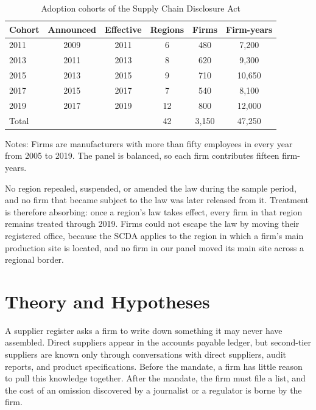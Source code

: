 \documentclass[11pt]{article}
\begin{document}
\begin{table}[ht]
\centering
\begin{threeparttable}
\caption{Adoption cohorts of the Supply Chain Disclosure Act}
\label{tab:cohorts}
\small
\begin{tabular}{lccccc}
\toprule
Cohort & Announced & Effective & Regions & Firms & Firm-years \\
\midrule
2011 & 2009 & 2011 & 6 & 480 & 7,200 \\
2013 & 2011 & 2013 & 8 & 620 & 9,300 \\
2015 & 2013 & 2015 & 9 & 710 & 10,650 \\
2017 & 2015 & 2017 & 7 & 540 & 8,100 \\
2019 & 2017 & 2019 & 12 & 800 & 12,000 \\
\midrule
Total & & & 42 & 3,150 & 47,250 \\
\bottomrule
\end{tabular}
\begin{tablenotes}\footnotesize
\item Notes: Firms are manufacturers with more than fifty employees in every year from 2005 to 2019. The panel is balanced, so each firm contributes fifteen firm-years.
\end{tablenotes}
\end{threeparttable}
\end{table}

No region repealed, suspended, or amended the law during the sample period, and no firm that became subject to the law was later released from it. Treatment is therefore absorbing: once a region's law takes effect, every firm in that region remains treated through 2019. Firms could not escape the law by moving their registered office, because the SCDA applies to the region in which a firm's main production site is located, and no firm in our panel moved its main site across a regional border.

\section{Theory and Hypotheses}

A supplier register asks a firm to write down something it may never have assembled. Direct suppliers appear in the accounts payable ledger, but second-tier suppliers are known only through conversations with direct suppliers, audit reports, and product specifications. Before the mandate, a firm has little reason to pull this knowledge together. After the mandate, the firm must file a list, and the cost of an omission discovered by a journalist or a regulator is borne by the firm.
\end{document}
